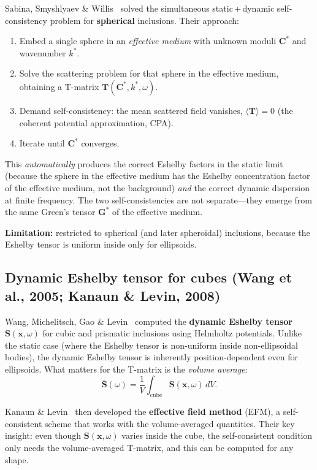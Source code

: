 \documentclass[11pt,a4paper]{article}
\newcommand{\bG}{\bm{G}}
\newcommand{\bT}{\bm{T}}
\newcommand{\bC}{\bm{C}}
\begin{document}
Sabina, Smyshlyaev \& Willis~\cite{sabina1993} solved the
simultaneous static\,+\,dynamic self-consistency problem for
\textbf{spherical} inclusions.  Their approach:
\begin{enumerate}[nosep]
  \item Embed a single sphere in an \emph{effective medium} with
    unknown moduli $\bC^*$ and wavenumber $k^*$.
  \item Solve the scattering problem for that sphere in the effective
    medium, obtaining a T-matrix $\bT(\bC^*, k^*, \omega)$.
  \item Demand self-consistency: the mean scattered field vanishes,
    $\langle\bT\rangle = 0$ (the coherent potential approximation, CPA).
  \item Iterate until $\bC^*$ converges.
\end{enumerate}
This \emph{automatically} produces the correct Eshelby factors in the
static limit (because the sphere in the effective medium has the
Eshelby concentration factor of the effective medium, not the
background) \emph{and} the correct dynamic dispersion at finite
frequency.  The two self-consistencies are not separate---they emerge
from the same Green's tensor $\bG^*$ of the effective medium.

\textbf{Limitation:} restricted to spherical (and later spheroidal)
inclusions, because the Eshelby tensor is uniform inside only for
ellipsoids.

\subsection{Dynamic Eshelby tensor for cubes (Wang et al., 2005; Kanaun \& Levin, 2008)}

Wang, Michelitsch, Gao \& Levin~\cite{wang2005} computed the
\textbf{dynamic Eshelby tensor} $\bm{S}(\bm{x}, \omega)$ for cubic
and prismatic inclusions using Helmholtz potentials.  Unlike the
static case (where the Eshelby tensor is non-uniform inside
non-ellipsoidal bodies), the dynamic Eshelby tensor is inherently
position-dependent even for ellipsoids.  What matters for the
T-matrix is the \emph{volume average}:
\begin{equation}\label{eq:Savg}
  \bar{\bm{S}}(\omega) = \frac{1}{V}\int_{\text{cube}}
    \bm{S}(\bm{x}, \omega)\,dV.
\end{equation}

Kanaun \& Levin~\cite{kanaun2008} then developed the
\textbf{effective field method} (EFM), a self-consistent scheme that
works with the volume-averaged quantities.  Their key insight: even
though $\bm{S}(\bm{x},\omega)$ varies inside the cube, the
self-consistent condition only needs the volume-averaged T-matrix, and
this can be computed for any shape.
\end{document}
